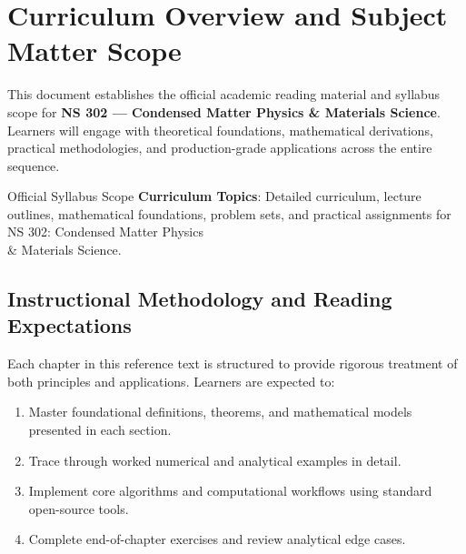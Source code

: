 \section{Curriculum Overview and Subject Matter Scope}

This document establishes the official academic reading material and syllabus scope for \textbf{NS 302 --- Condensed Matter Physics \& Materials Science}. Learners will engage with theoretical foundations, mathematical derivations, practical methodologies, and production-grade applications across the entire sequence.

\begin{InsightBox}{Official Syllabus Scope}
  \textbf{Curriculum Topics}: Detailed curriculum, lecture outlines, mathematical foundations, problem sets, and practical assignments for NS 302: Condensed Matter Physics \\& Materials Science.
\end{InsightBox}

\subsection{Instructional Methodology and Reading Expectations}

Each chapter in this reference text is structured to provide rigorous treatment of both principles and applications. Learners are expected to:
\begin{enumerate}
  \item Master foundational definitions, theorems, and mathematical models presented in each section.
  \item Trace through worked numerical and analytical examples in detail.
  \item Implement core algorithms and computational workflows using standard open-source tools.
  \item Complete end-of-chapter exercises and review analytical edge cases.
\end{enumerate}

